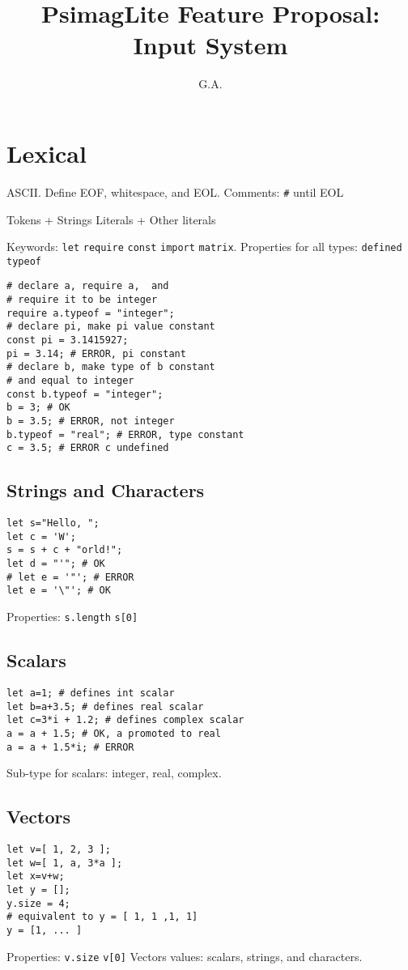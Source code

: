 \documentclass[twocolumn]{article}
\begin{document}
\title{PsimagLite Feature Proposal:
Input System}
\author{G.A.}
\maketitle

\section{Lexical}
ASCII.
Define EOF, whitespace, and EOL.
Comments: \verb!#! until EOL

Tokens + Strings Literals + Other literals

Keywords:
\verb!let! \verb!require! \verb!const! \verb!import! \verb!matrix!.
Properties for all types: \verb!defined! \verb!typeof!
\begin{verbatim}
# declare a, require a,  and
# require it to be integer
require a.typeof = "integer";
# declare pi, make pi value constant
const pi = 3.1415927;
pi = 3.14; # ERROR, pi constant
# declare b, make type of b constant 
# and equal to integer
const b.typeof = "integer"; 
b = 3; # OK
b = 3.5; # ERROR, not integer
b.typeof = "real"; # ERROR, type constant
c = 3.5; # ERROR c undefined
\end{verbatim}

\subsection{Strings and Characters} 
\begin{verbatim}
let s="Hello, ";
let c = 'W';
s = s + c + "orld!";
let d = "'"; # OK
# let e = '"'; # ERROR
let e = '\"'; # OK
\end{verbatim}
Properties: \verb!s.length! \verb!s[0]!

\subsection{Scalars} 
\begin{verbatim}
let a=1; # defines int scalar
let b=a+3.5; # defines real scalar
let c=3*i + 1.2; # defines complex scalar
a = a + 1.5; # OK, a promoted to real
a = a + 1.5*i; # ERROR
\end{verbatim}
Sub-type for scalars: integer, real, complex.

\subsection{Vectors} 
\begin{verbatim}
let v=[ 1, 2, 3 ];
let w=[ 1, a, 3*a ];
let x=v+w;
let y = [];
y.size = 4;
# equivalent to y = [ 1, 1 ,1, 1]
y = [1, ... ] 
\end{verbatim}
Properties: \verb!v.size! \verb!v[0]!
Vectors values: scalars, strings, and characters.
\end{document}
